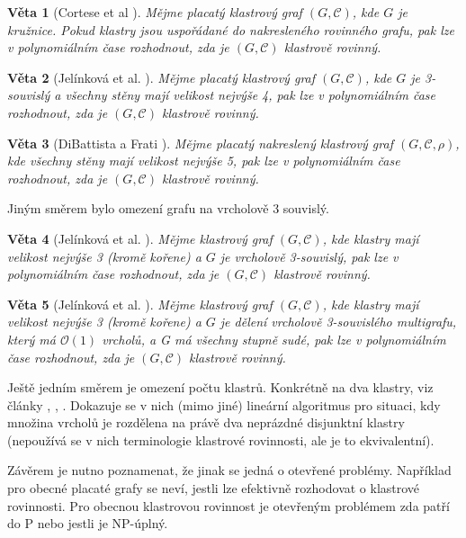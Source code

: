\documentclass[12pt,a4report]{report}
\newtheorem{theorem}{Věta}[chapter]
\theoremstyle{definition}
\begin{document}
\begin{theorem}[Cortese et al \cite{CorteseEtAl09}]
Mějme placatý klastrový graf  $(G, \mathcal C)$, kde $G$ je kružnice. Pokud klastry jsou uspořádané do nakresleného rovinného grafu, pak lze v polynomiálním čase rozhodnout, zda je  $(G, \mathcal C)$ klastrově rovinný.
\end{theorem}

\begin{theorem}[Jelínková et al. \cite{JelinkovaEtAl07}]
Mějme placatý klastrový graf  $(G, \mathcal C)$, kde $G$ je 3-souvislý a všechny stěny mají velikost nejvýše 4, pak lze v polynomiálním čase rozhodnout, zda je  $(G, \mathcal C)$ klastrově rovinný.
\end{theorem}

\begin{theorem}[DiBattista a Frati \cite{DiBattistaFrati07}]
Mějme placatý nakreslený klastrový graf  $(G, \mathcal C, \rho)$, kde všechny stěny mají velikost nejvýše 5, pak lze v polynomiálním čase rozhodnout, zda je  $(G, \mathcal C)$ klastrově rovinný.
\end{theorem}

Jiným směrem bylo omezení grafu na vrcholově 3 souvislý.

\begin{theorem}[Jelínková et al. \cite{JelinkovaEtAl07}]
Mějme klastrový graf $(G, \mathcal C)$, kde klastry mají velikost nejvýše 3 (kromě kořene) a $G$ je vrcholově 3-souvislý, pak lze v polynomiálním čase rozhodnout, zda je  $(G, \mathcal C)$ klastrově rovinný. 
\end{theorem}

\begin{theorem}[Jelínková et al. \cite{JelinkovaEtAl07}]
Mějme klastrový graf $(G, \mathcal C)$, kde klastry mají velikost nejvýše 3 (kromě kořene) a $G$ je dělení vrcholově 3-souvislého multigrafu, který má $\mathcal O(1)$ vrcholů, a G má všechny stupně sudé, pak lze v polynomiálním čase rozhodnout, zda je  $(G, \mathcal C)$ klastrově rovinný. 
\end{theorem}

Ještě jedním směrem je omezení počtu klastrů. Konkrétně na dva klastry, viz články \cite{BiedlI98}, \cite{BiedlII98}, \cite{BiedlIII98}. Dokazuje se v nich (mimo jiné) lineární algoritmus pro situaci, kdy množina vrcholů je rozdělena na právě dva neprázdné disjunktní klastry (nepoužívá se v nich terminologie klastrové rovinnosti, ale je to ekvivalentní). 

Závěrem je nutno poznamenat, že jinak se jedná o otevřené problémy. Například pro obecné placaté grafy se neví, jestli lze efektivně rozhodovat o klastrové rovinnosti. Pro obecnou klastrovou rovinnost je otevřeným problémem zda patří do P nebo jestli je NP-úplný.
\end{document}
